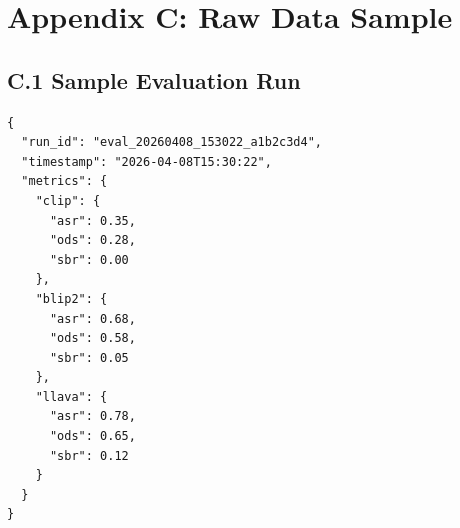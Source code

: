 \documentclass[12pt, a4paper]{article}
\begin{document}
\section{Appendix C: Raw Data Sample}

\subsection{C.1 Sample Evaluation Run}

\begin{verbatim}
{
  "run_id": "eval_20260408_153022_a1b2c3d4",
  "timestamp": "2026-04-08T15:30:22",
  "metrics": {
    "clip": {
      "asr": 0.35,
      "ods": 0.28,
      "sbr": 0.00
    },
    "blip2": {
      "asr": 0.68,
      "ods": 0.58,
      "sbr": 0.05
    },
    "llava": {
      "asr": 0.78,
      "ods": 0.65,
      "sbr": 0.12
    }
  }
}
\end{verbatim}
\end{document}
